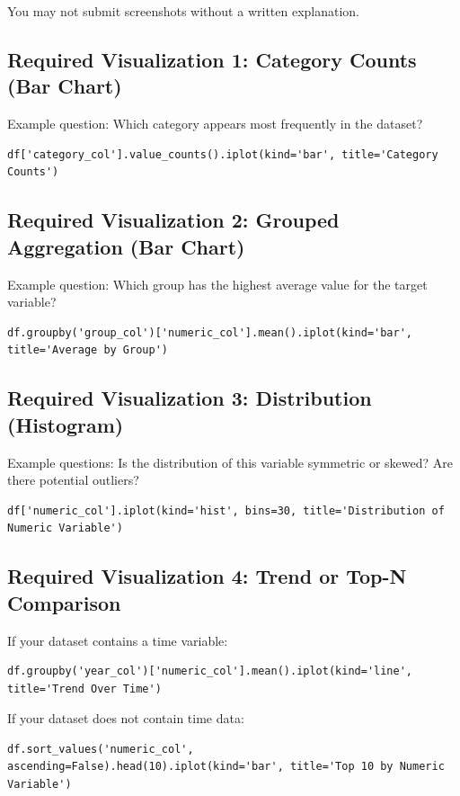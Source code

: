 \documentclass[11pt,letterpaper]{article}
\begin{document}
You may not submit screenshots without a written explanation.

\subsection{Required Visualization 1: Category Counts (Bar Chart)}

Example question: Which category appears most frequently in the dataset?
\begin{lstlisting}
df['category_col'].value_counts().iplot(kind='bar', title='Category Counts')
\end{lstlisting}

\subsection{Required Visualization 2: Grouped Aggregation (Bar Chart)}

Example question: Which group has the highest average value for the target variable?
\begin{lstlisting}
df.groupby('group_col')['numeric_col'].mean().iplot(kind='bar', title='Average by Group')
\end{lstlisting}

\subsection{Required Visualization 3: Distribution (Histogram)}

Example questions: Is the distribution of this variable symmetric or skewed? Are there potential outliers?
\begin{lstlisting}
df['numeric_col'].iplot(kind='hist', bins=30, title='Distribution of Numeric Variable')
\end{lstlisting}

\subsection{Required Visualization 4: Trend or Top-N Comparison}

If your dataset contains a time variable:
\begin{lstlisting}
df.groupby('year_col')['numeric_col'].mean().iplot(kind='line', title='Trend Over Time')
\end{lstlisting}

If your dataset does not contain time data:
\begin{lstlisting}
df.sort_values('numeric_col', ascending=False).head(10).iplot(kind='bar', title='Top 10 by Numeric Variable')
\end{lstlisting}
\end{document}
